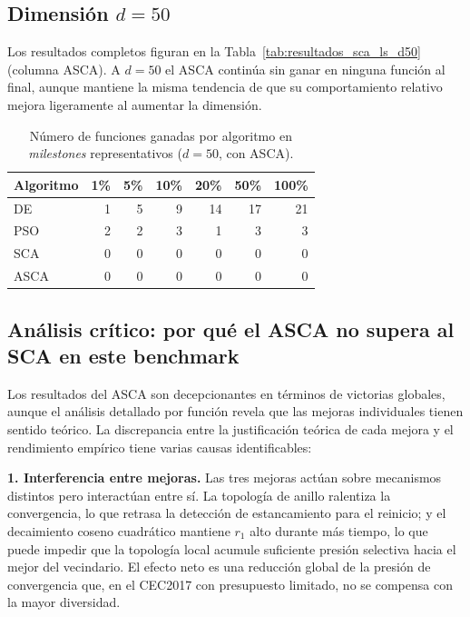 \documentclass[12pt,a4paper]{article}
\begin{document}
\subsection{Dimensión $d = 50$}

Los resultados completos figuran en la Tabla~\ref{tab:resultados_sca_ls_d50} (columna ASCA). A $d=50$ el ASCA continúa sin ganar en ninguna función al final, aunque mantiene la misma tendencia de que su comportamiento relativo mejora ligeramente al aumentar la dimensión.

\begin{table}[H]
\centering
\caption{Número de funciones ganadas por algoritmo en \textit{milestones} representativos ($d=50$, con ASCA).}
\label{tab:resumen_victorias_asca_d50}
\renewcommand{\arraystretch}{1.2}
\begin{tabular}{lrrrrrr}
\toprule
\textbf{Algoritmo} & \textbf{1\%} & \textbf{5\%} & \textbf{10\%} & \textbf{20\%} & \textbf{50\%} & \textbf{100\%} \\
\midrule
DE      &  1 &  5 &  9 & 14 & 17 & 21 \\
PSO     &  2 &  2 &  3 &  1 &  3 &  3 \\
SCA     &  0 &  0 &  0 &  0 &  0 &  0 \\
ASCA    &  0 &  0 &  0 &  0 &  0 &  0 \\
\bottomrule
\end{tabular}
\end{table}

\subsection{Análisis crítico: por qué el ASCA no supera al SCA en este benchmark}

Los resultados del ASCA son decepcionantes en términos de victorias globales, aunque el análisis detallado por función revela que las mejoras individuales tienen sentido teórico. La discrepancia entre la justificación teórica de cada mejora y el rendimiento empírico tiene varias causas identificables:

\textbf{1. Interferencia entre mejoras.} Las tres mejoras actúan sobre mecanismos distintos pero interactúan entre sí. La topología de anillo ralentiza la convergencia, lo que retrasa la detección de estancamiento para el reinicio; y el decaimiento coseno cuadrático mantiene $r_1$ alto durante más tiempo, lo que puede impedir que la topología local acumule suficiente presión selectiva hacia el mejor del vecindario. El efecto neto es una reducción global de la presión de convergencia que, en el CEC2017 con presupuesto limitado, no se compensa con la mayor diversidad.
\end{document}
